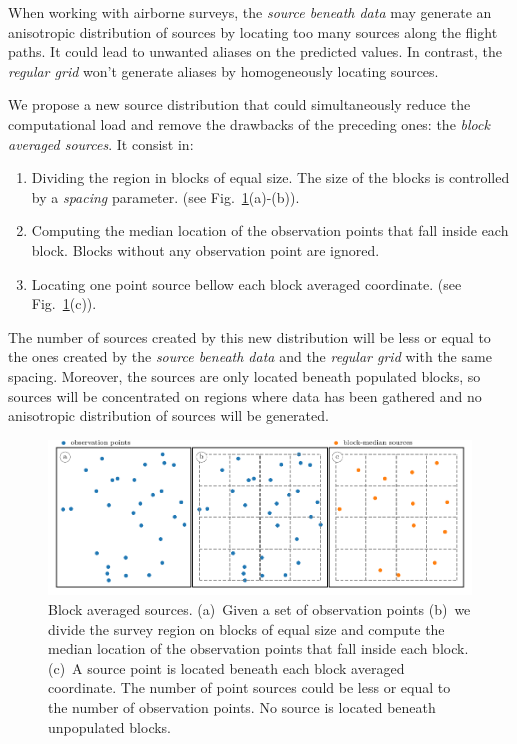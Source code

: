 \documentclass[twocolumn]{article}
\begin{document}
When working with airborne surveys, the \emph{source beneath data} may
generate an anisotropic distribution of sources by locating too many sources
along the flight paths.
It could lead to unwanted aliases on the predicted values.
In contrast, the \emph{regular grid} won't generate aliases by homogeneously
locating sources.

We propose a new source distribution that could simultaneously reduce the
computational load and remove the drawbacks of the preceding ones: the
\emph{block averaged sources}.
It consist in:

\begin{enumerate}
    \item Dividing the region in blocks of equal size. The size of the blocks
        is controlled by a \emph{spacing} parameter.
        (see Fig.~\ref{fig:block-median-sources}(a)-(b)).
    \item Computing the median location of the observation points that fall
        inside each block. Blocks without any observation point are ignored.
    \item Locating one point source bellow each block averaged coordinate.
        (see Fig.~\ref{fig:block-median-sources}(c)).
\end{enumerate}

The number of sources created by this new distribution will be less or equal to
the ones created by the \emph{source beneath data} and the \emph{regular
grid} with the same spacing.
Moreover, the sources are only located beneath populated blocks, so sources
will be concentrated on regions where data has been gathered and no anisotropic
distribution of sources will be generated.

\begin{figure}
    \includegraphics[width=\linewidth]{figs/block-median-sources-schematics.pdf}
    \caption{
        Block averaged sources.
        (a)~Given a set of observation points
        (b)~we divide the survey region on blocks of equal size and compute the
            median location of the observation points that fall inside each
            block.
        (c)~A source point is located beneath each block averaged coordinate.
            The number of point sources could be less or equal to the number of
            observation points. No source is located beneath unpopulated
            blocks.
    }
    \label{fig:block-median-sources}
\end{figure}
\end{document}
